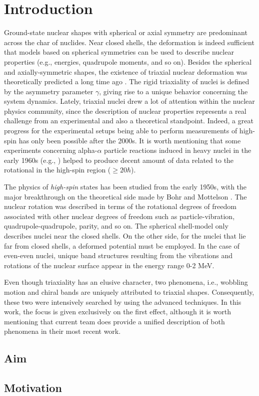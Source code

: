 \chapter{Introduction}

Ground-state nuclear shapes with spherical or axial symmetry are predominant across the char of nuclides. Near closed shells, the deformation is indeed sufficient that models based on spherical symmetries can be used to describe nuclear properties (e.g., energies, quadrupole moments, and so on). Besides the spherical and axially-symmetric shapes, the existence of triaxial nuclear deformation was theoretically predicted a long time ago \cite{bohr1998nuclear}. The rigid triaxiality of nuclei is defined by the asymmetry parameter $\gamma$, giving rise to a unique behavior concerning the system dynamics. Lately, triaxial nuclei drew a lot of attention within the nuclear physics community, since the description of nuclear properties represents a real challenge from an experimental and also a theoretical standpoint. Indeed, a great progress for the experimental setups being able to perform measurements of high-spin has only been possible after the 2000s. It is worth mentioning that some experiments concerning alpha-$\alpha$ particle reactions induced in heavy nuclei in the early 1960s (e.g., \cite{morinaga1963gamma}) helped to produce decent amount of data related to the rotational in the high-spin region ($\geq 20 \hbar$).

The physics of \emph{high-spin} states has been studied from the early 1950s, with the major breakthrough on the theoretical side made by Bohr and Mottelson \cite{bohr1998nuclear}. The nuclear rotation was described in terms of the rotational degrees of freedom associated with other nuclear degrees of freedom such as particle-vibration, quadrupole-quadrupole, parity, and so on. The spherical shell-model only describes nuclei near the closed shells. On the other side, for the nuclei that lie far from closed shells, a deformed potential must be employed. In the case of even-even nuclei, unique band structures resulting from the vibrations and rotations of the nuclear surface appear in the energy range 0-2 MeV. 

Even though triaxiality has an elusive character, two phenomena, i.e., wobbling motion and chiral bands are uniquely attributed to triaxial shapes. Consequently, these two were intensively searched by using the advanced techniques. In this work, the focus is given exclusively on the first effect, although it is worth mentioning that current team does provide a unified description of both phenomena in their most recent work.

\section{Aim}



\section{Motivation}


